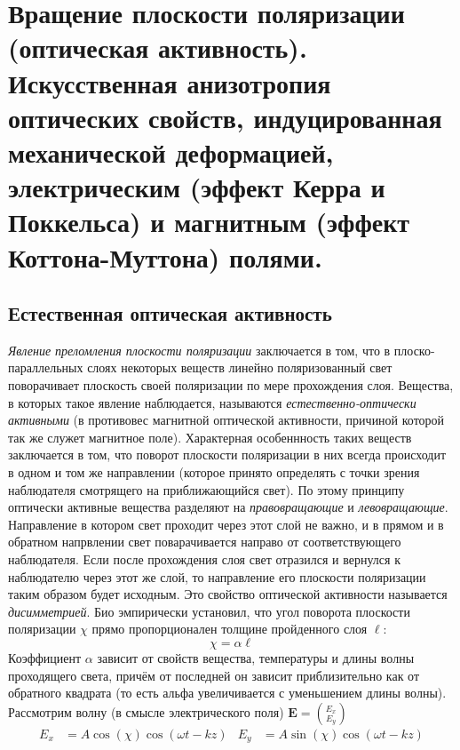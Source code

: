 \section{ Вращение плоскости поляризации (оптическая активность). Искусственная анизотропия оптических свойств, индуцированная механической деформацией, электрическим (эффект Керра и Поккельса) и магнитным (эффект Коттона-Муттона) полями.}
	\subsection{Естественная оптическая активность}
	\textit{Явление преломления плоскости поляризации} заключается в том, что в плоско-параллельных слоях некоторых веществ линейно поляризованный свет поворачивает плоскость своей поляризации по мере прохождения слоя. Вещества, в которых такое явление наблюдается, называются \textit{естественно-оптически активными} (в противовес магнитной оптической активности, причиной которой так же служет магнитное поле). Характерная особеннность таких веществ заключается в том, что поворот плоскости поляризации в них всегда происходит в одном и том же направлении (которое принято определять с точки зрения наблюдателя смотрящего на приближающийся свет). По этому принципу оптически активные вещества разделяют на \textit{правовращающие} и \textit{левовращающие}. Направление в котором свет проходит через этот слой не важно, и в прямом и в обратном напрвлении свет поварачивается направо от соответствующего наблюдателя. Если после прохождения слоя свет отразился и вернулся к наблюдателю через этот же слой, то направление его плоскости поляризации таким образом будет исходным. Это свойство оптической активности называется \textit{дисимметрией}.  
	Био эмпирически установил, что угол поворота плоскости поляризации $\chi$ прямо пропорционален толщине пройденного слоя $\ell$:
	\begin{equation}
	\label{chi}
	\chi = \alpha \ell
	\end{equation}
	Коэффициент $\alpha$ зависит от свойств вещества, температуры и длины волны проходящего света, причём от последней он зависит приблизительно как от обратного квадрата (то есть альфа увеличивается с уменьшением длины волны).
	Рассмотрим волну (в смысле электрического поля) $\mathbf{E} = \binom{E_{x}}{E_{y}}$
	\begin{align*}
	E_{x} &= A\cos(\chi)\cos(\omega t - kz) & E_{y} &= A\sin(\chi)\cos(\omega t - kz)
	\end{align*}
